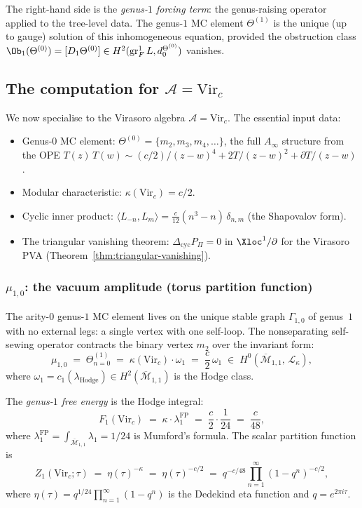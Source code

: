 \documentclass[11pt]{article}
\newcommand{\cA}{\mathcal{A}}
\DeclareMathOperator{\gr}{gr}
\begin{document}
The right-hand side is the \emph{genus-$1$ forcing term}: the
genus-raising operator applied to the tree-level data.  The genus-$1$
MC element $\Theta^{(1)}$ is the unique (up to gauge) solution of this
inhomogeneous equation, provided the obstruction class
$\Ob_1(\Theta^{(0)}) = [D_1\Theta^{(0)}] \in
H^2(\gr_F^1 L, d_0^{\Theta^{(0)}})$ vanishes.

\subsection{The computation for $\cA = \mathrm{Vir}_c$}

We now specialise to the Virasoro algebra $\cA = \mathrm{Vir}_c$.
The essential input data:
\begin{itemize}[leftmargin=1.8em]
\item Genus-$0$ MC element:
  $\Theta^{(0)} = \{m_2, m_3, m_4, \ldots\}$, the full $A_\infty$
  structure from the OPE $T(z)\,T(w) \sim (c/2)/(z-w)^4 + 2T/(z-w)^2
  + \partial T/(z-w)$.
\item Modular characteristic: $\kappa(\mathrm{Vir}_c) = c/2$.
\item Cyclic inner product: $\langle L_{-n}, L_m \rangle =
  \frac{c}{12}(n^3 - n)\,\delta_{n,m}$ (the Shapovalov form).
\item The triangular vanishing theorem: $\Delta_{\mathrm{cyc}} P_\Pi = 0$
  in $\Xloc^1/\partial$ for the Virasoro PVA
  (Theorem~\ref{thm:triangular-vanishing}).
\end{itemize}

\subsubsection{$\mu_{1,0}$: the vacuum amplitude (torus partition function)}

The arity-$0$ genus-$1$ MC element lives on the unique stable graph
$\Gamma_{1,0}$ of genus~$1$ with no external legs: a single vertex
with one self-loop.  The nonseparating self-sewing operator contracts
the binary vertex $m_2$ over the invariant form:
\begin{equation}\label{eq:wn-mu10}
\mu_{1,0}
\;=\;
\Theta^{(1)}_{n=0}
\;=\;
\kappa(\mathrm{Vir}_c) \cdot \omega_1
\;=\;
\frac{c}{2}\,\omega_1
\;\in\; H^0(\overline{\mathcal{M}}_{1,1},\,\mathcal{L}_\kappa),
\end{equation}
where $\omega_1 = c_1(\lambda_{\mathrm{Hodge}}) \in
H^2(\overline{\mathcal{M}}_{1,1})$ is the Hodge class.

The \emph{genus-$1$ free energy} is the Hodge integral:
\[
F_1(\mathrm{Vir}_c)
\;=\;
\kappa \cdot \lambda_1^{\mathrm{FP}}
\;=\;
\frac{c}{2} \cdot \frac{1}{24}
\;=\;
\frac{c}{48},
\]
where $\lambda_1^{\mathrm{FP}} = \int_{\overline{\mathcal{M}}_{1,1}}
\lambda_1 = 1/24$ is Mumford's formula.  The scalar partition function is
\begin{equation}\label{eq:wn-partition}
Z_1(\mathrm{Vir}_c;\tau)
\;=\;
\eta(\tau)^{-\kappa}
\;=\;
\eta(\tau)^{-c/2}
\;=\;
q^{-c/48}\prod_{n=1}^{\infty}(1-q^n)^{-c/2},
\end{equation}
where $\eta(\tau) = q^{1/24}\prod_{n=1}^\infty(1-q^n)$ is the
Dedekind eta function and $q = e^{2\pi i\tau}$.
\end{document}
